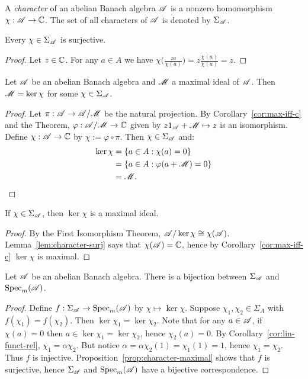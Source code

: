 \begin{definition}
	A \emph{character} of an abelian Banach algebra $\mathscr{A}$ is a nonzero homomorphism $\chi:\mathscr{A} \rightarrow \mathbb{C}$. The set of all characters of $\mathscr{A}$ is denoted by $\Sigma_{\mathscr{A}}$.
\end{definition}

\begin{lemma}\label{lem:character-surj}
	Every $\chi \in \Sigma_{\mathscr{A}}$ is surjective.
\end{lemma}
	\begin{proof}
		Let $z \in \mathbb{C}$. For any $a \in A$ we have $\chi \bigl( \frac{z a}{\chi(a)} \bigr) = z \frac{\chi(a)}{\chi(a)} = z$.
	\end{proof}

\begin{proposition}\label{prop:character-maximal}
	Let $\mathscr{A}$ be an abelian Banach algebra and $\mathscr{M}$ a maximal ideal of $\mathscr{A}$. Then $\mathscr{M} = \ker \chi$ for some $\chi \in \Sigma_{\mathscr{A}}$.
\end{proposition}
	\begin{proof}
		Let $\pi:\mathscr{A} \rightarrow \mathscr{A}/\mathscr{M}$ be the natural projection. By Corollary~\ref{cor:max-iff-c} and the  Theorem, $\varphi:\mathscr{A}/\mathscr{M} \rightarrow \mathbb{C}$ given by $z 1_{\mathscr{A}} + \mathscr{M} \mapsto z$ is an isomorphism. Define $\chi:\mathscr{A} \rightarrow \mathbb{C}$ by $\chi := \varphi \circ \pi$. Then $\chi \in \Sigma_{\mathscr{A}}$ and:
		\begin{align*}
			\ker \chi
			&= \{a \in A : \chi(a) = 0\} \\
			&= \{a \in A : \varphi(a + \mathscr{M}) = 0\} \\
			&= \mathscr{M}. \qedhere
		\end{align*}
	\end{proof}

\begin{proposition}
	If $\chi \in \Sigma_{\mathscr{A}}$, then $\ker \chi$ is a maximal ideal.
\end{proposition}
	\begin{proof}
		By the First Isomorphism Theorem, $\mathscr{A}/\ker \chi \cong \chi(\mathscr{A})$. Lemma~\ref{lem:character-surj} says that $\chi(\mathscr{A}) = \mathbb{C}$, hence by Corollary~\ref{cor:max-iff-c} $\ker \chi$ is maximal.
	\end{proof}

\begin{theorem}
	Let $\mathscr{A}$ be an abelian Banach algebra. There is a bijection between $\Sigma_{\mathscr{A}}$ and $\operatorname{Spec}_m(\mathscr{A})$.
\end{theorem}
	\begin{proof}
		Define $f:\Sigma_{\mathscr{A}} \rightarrow \operatorname{Spec}_m(\mathscr{A})$ by $\chi \mapsto \ker \chi$. Suppose $\chi_1,\chi_2 \in \Sigma_A$ with $f(\chi_1) = f (\chi_2)$. Then $\ker \chi_1 = \ker \chi_2$. Note that for any $a \in \mathscr{A}$, if $\chi(a) = 0$ then $a \in \ker \chi_1 = \ker \chi_2$, hence $\chi_2(a) = 0$. By Corollary~\ref{cor:lin-funct-rel}, $\chi_1 = \alpha \chi_2$. But notice $\alpha = \alpha \chi_2(1) = \chi_1(1) = 1$, hence $\chi_1 = \chi_2$. Thus $f$ is injective. Proposition~\ref{prop:character-maximal} shows that $f$ is surjective, hence $\Sigma_{\mathscr{A}}$ and $\operatorname{Spec}_m(\mathscr{A})$ have a bijective correspondence.
	\end{proof}

